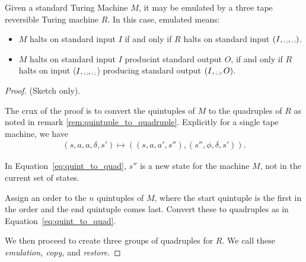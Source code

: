 \begin{theorem}\label{thm:reversible_turing_machine_emulates_standard}
  Given a standard Turing Machine $M$, it may be emulated by a three tape reversible
  Turing machine $R$. In this case, emulated means:
  \begin{itemize}
    \item $M$ halts on standard input $I$ if and only if $R$ halts on standard input $(I,\blank,\blank)$.
    \item $M$ halts on standard input $I$ producint standard output $O$,
      if and only if $R$ halts on input ($I,\blank,\blank$) producing standard output $(I,\blank,O)$.
  \end{itemize}
\end{theorem}
\begin{proof}
  (Sketch only).

  The crux of the proof is to convert the quintuples of $M$ to the quadruples of
  $R$ as noted in remark \vref{rem:quintuple_to_quadruple}. Explicitly for a single
  tape machine, we have
  \begin{align}
    (s,a,a,\delta,s') \mapsto \left((s,a,a',s''),
          (s'',\phi,\delta,s')\right).\label{eq:quint_to_quad}
  \end{align}
  
  In Equation~\eqref{eq:quint_to_quad}, $s''$ is a new state for the machine $M$, 
  not in the current set of states.

  Assign an order to the $n$ quintuples of $M$, where the start
  quintuple is the first in the order and the end quintuple comes last. Convert these to
  quadruples as in Equation~\eqref{eq:quint_to_quad}. 
  
  We then proceed to create three groups of quadruples for $R$.
  We call these \emph{emulation, copy,} and \emph{restore}.


\end{proof}
